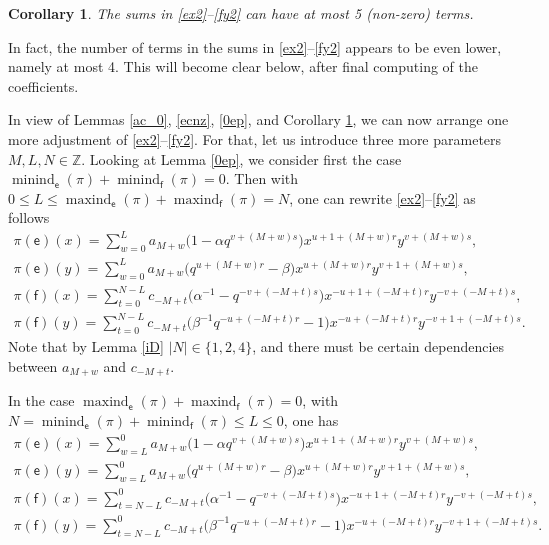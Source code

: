 \documentclass[pdftex]{sigma}
\numberwithin{equation}{section}
\newtheorem{Corollary}[Theorem]{Corollary}
\begin{document}
\begin{Corollary}\label{5terms}The sums in \eqref{ex2}--\eqref{fy2} can have at most 5 (non-zero) terms.
\end{Corollary}

\begin{Remark}In fact, the number of terms in the sums in \eqref{ex2}--\eqref{fy2} appears to be even lower, namely at most 4. This will become clear below, after final computing of the coefficients.
\end{Remark}

In view of Lemmas \ref{ac_0}, \ref{ecnz}, \ref{0ep}, and Corollary \ref{5terms}, we can now arrange one more adjustment of \eqref{ex2}--\eqref{fy2}. For that, let us introduce three more parameters $M,L,N\in\mathbb{Z}$. Looking at Lemma \ref{0ep}, we consider first the case $\operatorname{minind}_\mathsf{e}(\pi)+\operatorname{minind}_\mathsf{f}(\pi)=0$. Then with $0\le L\le\operatorname{maxind}_\mathsf{e}(\pi)+
\operatorname{maxind}_\mathsf{f}(\pi)=N$, one can rewrite \eqref{ex2}--\eqref{fy2} as follows
\begin{gather}
\pi(\mathsf{e})(x) =\sum_{w=0}^La_{M+w}\big(1-\alpha q^{v+(M+w)s}\big)x^{u+1+(M+w)r}y^{v+(M+w)s}, \label{ex3}\\
\pi(\mathsf{e})(y) =\sum_{w=0}^La_{M+w}\big(q^{u+(M+w)r}-\beta\big)x^{u+(M+w)r}y^{v+1+(M+w)s},\label{ey3}\\
\pi(\mathsf{f})(x) =\sum_{t=0}^{N-L}c_{-M+t}\big(\alpha^{-1}-q^{-v+(-M+t)s}\big)x^{-u+1+(-M+t)r}y^{-v+(-M+t)s}, \label{fx3}\\
\pi(\mathsf{f})(y)=\sum_{t=0}^{N-L}c_{-M+t}\big(\beta^{-1}q^{-u+(-M+t)r}-1\big)x^{-u+(-M+t)r}y^{-v+1+(-M+t)s}. \label{fy3}
\end{gather}
Note that by Lemma \ref{iD} $|N|\in\{1,2,4\}$, and there must be certain dependencies between $a_{M+w}$ and $c_{-M+t}$.

In the case $\operatorname{maxind}_\mathsf{e}(\pi)+\operatorname{maxind}_\mathsf{f}(\pi)=0$, with $N=\operatorname{minind}_\mathsf{e}(\pi)+\operatorname{minind}_\mathsf{f}(\pi)\le L\le 0$, one has
\begin{gather}
\pi(\mathsf{e})(x) =\sum_{w=L}^0a_{M+w}\big(1-\alpha q^{v+(M+w)s}\big)x^{u+1+(M+w)r}y^{v+(M+w)s},\label{ex4}\\
\pi(\mathsf{e})(y) =\sum_{w=L}^0a_{M+w}\big(q^{u+(M+w)r}-\beta\big)x^{u+(M+w)r}y^{v+1+(M+w)s}, \label{ey4}\\
\pi(\mathsf{f})(x) =\sum_{t=N-L}^0c_{-M+t}\big(\alpha^{-1}-q^{-v+(-M+t)s}\big)x^{-u+1+(-M+t)r}y^{-v+(-M+t)s}, \label{fx4}\\
\pi(\mathsf{f})(y) =\sum_{t=N-L}^0c_{-M+t}\big(\beta^{-1}q^{-u+(-M+t)r}-1\big)x^{-u+(-M+t)r}y^{-v+1+(-M+t)s}. \label{fy4}
\end{gather}
\end{document}
